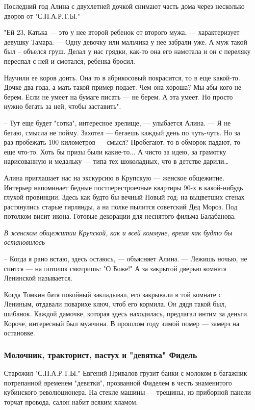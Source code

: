 Последний год Алина с двухлетней дочкой снимают часть дома через несколько
дворов от "С.П.А.Р.Т.Ы." 

"Ей 23, Катька --- это у нее второй ребенок от второго мужа, --- характеризует
девушку Тамара. --- Одну девочку или мальчика у нее забрали уже. А муж такой был
– объелся груш. Делал у нас грядки, как-то она его намотала и он с переляку
переспал с ней и смотался, ребенка бросил. 

Научили ее коров доить. Она то в абрикосовый покрасится, то в еще какой-то.
Дочке два года, а мать такой пример подает. Чем она хороша? Мы абы кого не
берем. Если не умеет на бумаге писать --- не берем. А эта умеет. Но просто нужно
бегать за ней, чтобы заставить".

– Тут еще будет "сотка", интересное зрелище, --- улыбается Алина. --- Я не бегаю,
смысла не пойму. Захотел --- бегаешь каждый день по чуть-чуть. Но за раз
пробежать 100 километров --- смысл? Пробегают, то в обморок падают, то еще
что-то. Хоть бы призы были какие-то... А чисто за идею, за грамотку
нарисованную и медальку --- типа тех шоколадных, что в детстве дарили…

Алина приглашает нас на экскурсию в Крупскую --- женское общежитие. Интерьер
напоминает бедные постперестроечные квартиры 90-х в какой-нибудь глухой
провинции. Здесь как будто бы вечный Новый год: на выцветших стенах растянулись
старые гирлянды, а на полке пылится советский Дед Мороз. Под потолком висит
икона. Готовые декорации для неснятого фильма Балабанова.

\emph{В женском общежитии Крупской, как и всей коммуне, время как будто бы остановилось}

– Когда я рано встаю, здесь остаюсь, --- объясняет Алина. --- Лежишь ночью, не
спится --- на потолок смотришь: "О Боже!" А за закрытой дверью комната Ленинской
называется. 

Когда Томкин батя покойный закладывал, его закрывали в той комнате с Лениным,
отдавали поварихе ключ, чтоб его кормила. Он дядя такой был, шибанок. Каждой
дамочке, которая здесь находилась, предлагал интим за деньги. Короче,
интересный был мужчина. В прошлом году зимой помер --- замерз на остановке. 

\subsubsection{Молочник, тракторист, пастух и "девятка" Фидель}

Старожил "С.П.А.Р.Т.Ы." Евгений Привалов грузит банки с молоком в багажник
потрепанной временем "девятки", прозванной Фиделем в честь знаменитого
кубинского революционера. На стекле машины --- трещины, из приборной панели
торчат провода, салон набит всяким хламом.

